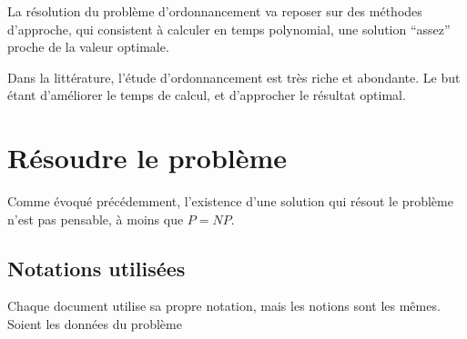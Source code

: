 \documentclass[a4paper,12pt]{report}
\theoremstyle{plain}				%
\theoremstyle{definition}				%
\begin{document}
La résolution du problème d'ordonnancement va reposer sur des méthodes
d'approche, qui consistent à calculer en
temps polynomial, une solution ``assez'' proche de la valeur optimale.

Dans la littérature, l'étude d'ordonnancement est très riche et
abondante.
Le but étant d'améliorer le temps de calcul, et d'approcher le
résultat optimal.

\section{Résoudre le problème}

Comme évoqué précédemment, l'existence d'une solution qui résout le
problème n'est pas pensable, à moins que $P = NP$.

\subsection{Notations utilisées}

Chaque document utilise sa propre notation, mais les notions sont les mêmes.
Soient les données du problème
\end{document}
